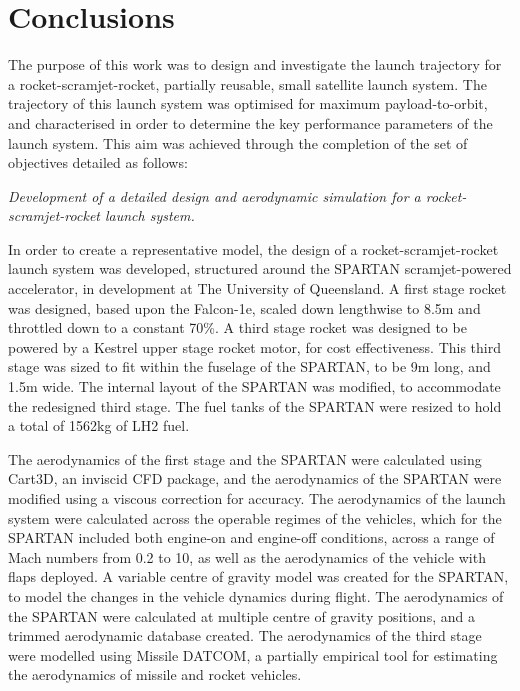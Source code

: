 
\cleardoublepage
\chapter{Conclusions}


The purpose of this work was to design and investigate the launch trajectory for a rocket-scramjet-rocket, partially reusable, small satellite launch system. 
The trajectory of this launch system was optimised for maximum payload-to-orbit, and characterised in order to determine the key performance parameters of the launch system. 
This aim was achieved through the completion of the set of objectives detailed as follows:

	\emph{Development of a detailed design and aerodynamic simulation for a rocket-scramjet-rocket launch system.}
	
	In order to create a representative model, the design of a rocket-scramjet-rocket launch system was developed, structured around the SPARTAN scramjet-powered accelerator, in development at The University of Queensland. A first stage rocket was designed, based upon the Falcon-1e, scaled down lengthwise to 8.5m and throttled down to a constant 70\%.
	A third stage rocket was designed to be powered by a Kestrel upper stage rocket motor, for cost effectiveness. This third stage was sized to fit within the fuselage of the SPARTAN, to be 9m long, and 1.5m wide.   
The internal layout of the SPARTAN was modified, to accommodate the redesigned third stage. The fuel tanks of the SPARTAN were resized to hold a total of 1562kg of LH2 fuel. 

The aerodynamics of the first stage and the SPARTAN were calculated using Cart3D, an inviscid CFD package, and the aerodynamics of the SPARTAN were modified using a viscous correction for accuracy. The aerodynamics of the launch system were calculated across the operable regimes of the vehicles, which for the SPARTAN included both engine-on and engine-off conditions, across a range of Mach numbers from 0.2 to 10, as well as the aerodynamics of the vehicle with flaps deployed. A variable centre of gravity model was created for the SPARTAN, to model the changes in the vehicle dynamics during flight. The aerodynamics of the SPARTAN were calculated at multiple centre of gravity positions, and a trimmed aerodynamic database created. 
The aerodynamics of the third stage were modelled using Missile DATCOM, a partially empirical tool for estimating the aerodynamics of missile and rocket vehicles. 

